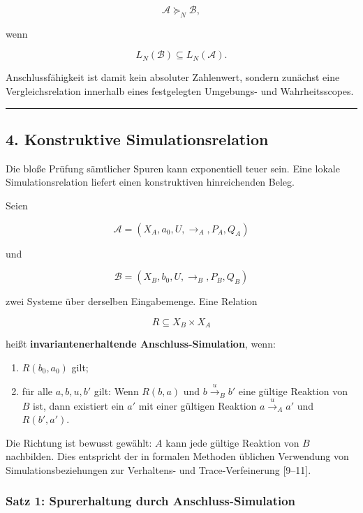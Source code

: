 \documentclass[
  10pt,
  a4paper,
]{article}
\providecommand{\tightlist}{%
  \setlength{\itemsep}{0pt}\setlength{\parskip}{0pt}}
\begin{document}
\[
\mathcal A\succeq_N\mathcal B,
\]

wenn

\[
L_N(\mathcal B)\subseteq L_N(\mathcal A).
\]

Anschlussfähigkeit ist damit kein absoluter Zahlenwert, sondern zunächst
eine Vergleichsrelation innerhalb eines festgelegten Umgebungs- und
Wahrheitsscopes.

\begin{center}\rule{0.5\linewidth}{0.5pt}\end{center}

\hypertarget{konstruktive-simulationsrelation}{%
\subsection{4. Konstruktive
Simulationsrelation}\label{konstruktive-simulationsrelation}}

Die bloße Prüfung sämtlicher Spuren kann exponentiell teuer sein. Eine
lokale Simulationsrelation liefert einen konstruktiven hinreichenden
Beleg.

Seien

\[
\mathcal A=(X_A,a_0,U,\to_A,P_A,Q_A)
\]

und

\[
\mathcal B=(X_B,b_0,U,\to_B,P_B,Q_B)
\]

zwei Systeme über derselben Eingabemenge. Eine Relation

\[
R\subseteq X_B\times X_A
\]

heißt \textbf{invariantenerhaltende Anschluss-Simulation}, wenn:

\begin{enumerate}
\def\labelenumi{\arabic{enumi}.}
\tightlist
\item
  \(R(b_0,a_0)\) gilt;
\item
  für alle \(a,b,u,b'\) gilt: Wenn \(R(b,a)\) und
  \(b\xrightarrow{u}_B b'\) eine gültige Reaktion von \(B\) ist, dann
  existiert ein \(a'\) mit einer gültigen Reaktion
  \(a\xrightarrow{u}_A a'\) und \(R(b',a')\).
\end{enumerate}

Die Richtung ist bewusst gewählt: \(A\) kann jede gültige Reaktion von
\(B\) nachbilden. Dies entspricht der in formalen Methoden üblichen
Verwendung von Simulationsbeziehungen zur Verhaltens- und
Trace-Verfeinerung {[}9--11{]}.

\hypertarget{satz-1-spurerhaltung-durch-anschluss-simulation}{%
\subsubsection{Satz 1: Spurerhaltung durch
Anschluss-Simulation}\label{satz-1-spurerhaltung-durch-anschluss-simulation}}
\end{document}

